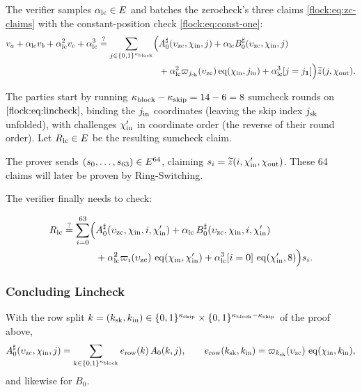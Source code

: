 \vspace{3mm}

The verifier samples $\alpha_{\mathrm{lc}}\in E$ and batches the zerocheck's three claims \eqref{flock:eq:zc-claims} with the constant-position check \eqref{flock:eq:const-one}:
\begin{equation}\label{flock:eq:lincheck}
\begin{split}
v_a+\alpha_{\mathrm{lc}} v_b+\alpha_{\mathrm{lc}}^2v_c+\alpha_{\mathrm{lc}}^3\stackrel{?}{=}\sum_{j\in\{0,1\}^{\kappa_{\mathrm{block}}}}\Bigl(&A^{\sharp}_0(\upsilon_{\mathrm{zc}},\chi_{\mathrm{in}},j)+\alpha_{\mathrm{lc}}B^{\sharp}_0(\upsilon_{\mathrm{zc}},\chi_{\mathrm{in}},j)\\
&+\alpha_{\mathrm{lc}}^2\varpi_{j_{\mathrm{sk}}}(\upsilon_{\mathrm{zc}})\operatorname{eq}(\chi_{\mathrm{in}},j_{\mathrm{in}})+\alpha_{\mathrm{lc}}^3[j=j_{\mathbf{1}}]\Bigr)\widetilde{z}(j,\chi_{\mathrm{out}}).
\end{split}
\end{equation}

\vspace{2mm}

The parties start by running $\kappa_{\mathrm{block}} - \kappa_{\mathrm{skip}} = 14 - 6 = 8$ sumcheck rounds on $\eqref{flock:eq:lincheck}$, binding the $j_{\mathrm{in}}$ coordinates (leaving the skip index $j_{\mathrm{sk}}$ unfolded), with challenges $\chi'_{\mathrm{in}}$ in coordinate order (the reverse of their round order). Let $R_{\mathrm{lc}}\in E$ be the resulting sumcheck claim.

The prover sends $(s_0,\ldots,s_{63})\in E^{64}$, claiming $s_i=\widetilde{z}(i,\chi'_{\mathrm{in}},\chi_{\mathrm{out}})$. These 64 claims will later be proven by Ring-Switching.

The verifier finally needs to check:

\begin{equation}\label{flock:eq:lincheck-terminal}
\begin{split}
R_{\mathrm{lc}}\stackrel{?}{=}\sum_{i=0}^{63}\Bigl(&A^{\sharp}_0(\upsilon_{\mathrm{zc}},\chi_{\mathrm{in}},i,\chi'_{\mathrm{in}})+\alpha_{\mathrm{lc}}\,B^{\sharp}_0(\upsilon_{\mathrm{zc}},\chi_{\mathrm{in}},i,\chi'_{\mathrm{in}})\\
&+\alpha_{\mathrm{lc}}^2\varpi_i(\upsilon_{\mathrm{zc}})\,\operatorname{eq}(\chi_{\mathrm{in}},\chi'_{\mathrm{in}})+\alpha_{\mathrm{lc}}^3[i=0]\,\operatorname{eq}(\chi'_{\mathrm{in}},8)\Bigr)s_i.
\end{split}
\end{equation}

\subsubsection{Concluding Lincheck}\label{flock:native}


With the row split $k=(k_{\mathrm{sk}},k_{\mathrm{in}}) \in\{0,1\}^{\kappa_{\mathrm{skip}}} \times \{0,1\}^{\kappa_{\mathrm{block}}-\kappa_{\mathrm{skip}}}$ of the proof above,
\begin{equation}\label{flock:eq:erow}
A^{\sharp}_0(\upsilon_{\mathrm{zc}},\chi_{\mathrm{in}},j)=\sum_{k\in\{0,1\}^{\kappa_{\mathrm{block}}}}e_{\mathrm{row}}(k)\,A_0(k,j),\qquad
e_{\mathrm{row}}(k_{\mathrm{sk}},k_{\mathrm{in}})=\varpi_{k_{\mathrm{sk}}}(\upsilon_{\mathrm{zc}})\,\operatorname{eq}(\chi_{\mathrm{in}},k_{\mathrm{in}}),
\end{equation}
and likewise for $B_0$.

